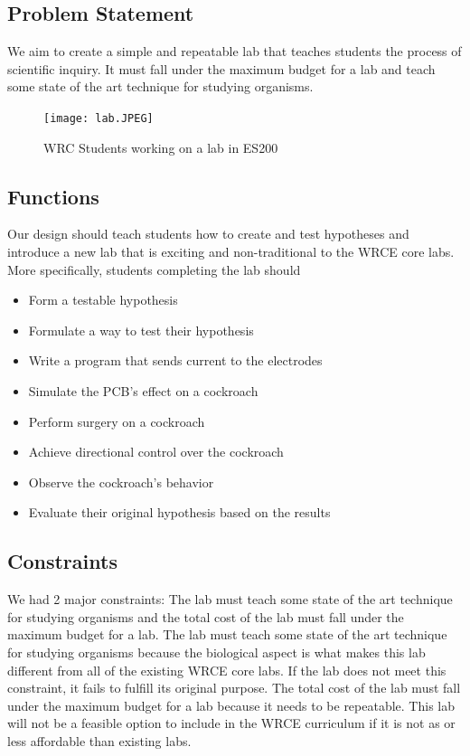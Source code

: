 \documentclass{article}
\begin{document}
\subsection{Problem Statement}
\par We aim to create a simple and repeatable lab that teaches students the process of scientific inquiry. It must fall under the maximum budget for a lab and teach some state of the art technique for studying organisms.

\begin{figure}[ht!]
\centering
\texttt{[image: lab.JPEG]}
\caption{WRC Students working on a lab in ES200}
\label{fig:hollywood}
\end{figure}

\subsection{Functions}
\par Our design should teach students how to create and test hypotheses and introduce a new lab that is exciting and non-traditional to the WRCE core labs. More specifically, students completing the lab should

\begin{itemize}
  \item Form a testable hypothesis
  \item Formulate a way to test their hypothesis
  \item Write a program that sends current to the electrodes
  \item Simulate the PCB's effect on a cockroach
  \item Perform surgery on a cockroach
  \item Achieve directional control over the cockroach
  \item Observe the cockroach's behavior
  \item Evaluate their original hypothesis based on the results
\end{itemize}

\subsection{Constraints}
\par We had 2 major constraints: The lab must teach some state of the art technique for studying organisms and the total cost of the lab must fall under the maximum budget for a lab. The lab must teach some state of the art technique for studying organisms because the biological aspect is what makes this lab different from all of the existing WRCE core labs. If the lab does not meet this constraint, it fails to fulfill its original purpose. The total cost of the lab must fall under the maximum budget for a lab because it needs to be repeatable. This lab will not be a feasible option to include in the WRCE curriculum if it is not as or less affordable than existing labs.
\end{document}
